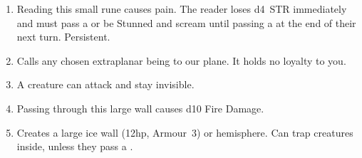 \documentclass[itdr]{subfiles}
\begin{document}
\begin{enumerate}
	\item {} Reading this small rune causes pain. The reader loses d4~STR immediately and must pass a  or be Stunned and scream until passing a  at the end of their next turn. Persistent.
	\item {} Calls any chosen extraplanar being to our plane. It holds no loyalty to you.
	\item {} A creature can attack and stay invisible.
	\item {} Passing through this large wall causes d10 Fire Damage.
	\item {} Creates a large ice wall (12hp, Armour~3) or hemisphere. Can trap creatures inside, unless they pass a .
\end{enumerate}

\vfill
\break
\end{document}

